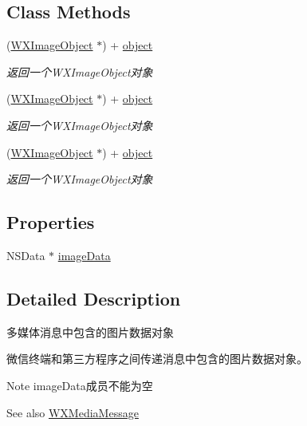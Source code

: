 \subsection*{Class Methods}
\begin{DoxyCompactItemize}
\item 
(\mbox{\hyperlink{interface_w_x_image_object}{W\+X\+Image\+Object}} $\ast$) + \mbox{\hyperlink{interface_w_x_image_object_a9316feca370a55f884b47c0fbabd694a}{object}}
\begin{DoxyCompactList}\small\item\em 返回一个\+W\+X\+Image\+Object对象 \end{DoxyCompactList}\item 
(\mbox{\hyperlink{interface_w_x_image_object}{W\+X\+Image\+Object}} $\ast$) + \mbox{\hyperlink{interface_w_x_image_object_a9316feca370a55f884b47c0fbabd694a}{object}}
\begin{DoxyCompactList}\small\item\em 返回一个\+W\+X\+Image\+Object对象 \end{DoxyCompactList}\item 
(\mbox{\hyperlink{interface_w_x_image_object}{W\+X\+Image\+Object}} $\ast$) + \mbox{\hyperlink{interface_w_x_image_object_a9316feca370a55f884b47c0fbabd694a}{object}}
\begin{DoxyCompactList}\small\item\em 返回一个\+W\+X\+Image\+Object对象 \end{DoxyCompactList}\end{DoxyCompactItemize}
\subsection*{Properties}
\begin{DoxyCompactItemize}
\item 
N\+S\+Data $\ast$ \mbox{\hyperlink{interface_w_x_image_object_a65a8cae09a593c4b96a97788cd8adf52}{image\+Data}}
\end{DoxyCompactItemize}


\subsection{Detailed Description}
多媒体消息中包含的图片数据对象 

微信终端和第三方程序之间传递消息中包含的图片数据对象。 \begin{DoxyNote}{Note}
image\+Data成员不能为空 
\end{DoxyNote}
\begin{DoxySeeAlso}{See also}
\mbox{\hyperlink{interface_w_x_media_message}{W\+X\+Media\+Message}} 
\end{DoxySeeAlso}


